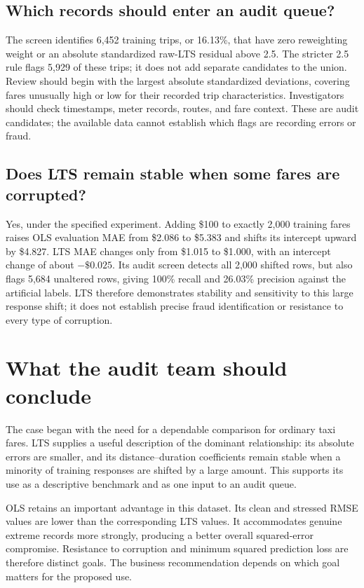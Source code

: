 \documentclass[11pt,letterpaper]{article}
\begin{document}
\subsection{Which records should enter an audit queue?}
The screen identifies 6,452 training trips, or 16.13\%, that have zero reweighting weight or an absolute standardized raw-LTS residual above 2.5. The stricter 2.5 rule flags 5,929 of these trips; it does not add separate candidates to the union. Review should begin with the largest absolute standardized deviations, covering fares unusually high or low for their recorded trip characteristics. Investigators should check timestamps, meter records, routes, and fare context. These are audit candidates; the available data cannot establish which flags are recording errors or fraud.

\subsection{Does LTS remain stable when some fares are corrupted?}
Yes, under the specified experiment. Adding \$100 to exactly 2,000 training fares raises OLS evaluation MAE from \$2.086 to \$5.383 and shifts its intercept upward by \$4.827. LTS MAE changes only from \$1.015 to \$1.000, with an intercept change of about $-\$0.025$. Its audit screen detects all 2,000 shifted rows, but also flags 5,684 unaltered rows, giving 100\% recall and 26.03\% precision against the artificial labels. LTS therefore demonstrates stability and sensitivity to this large response shift; it does not establish precise fraud identification or resistance to every type of corruption.

\clearpage
\section{What the audit team should conclude}
The case began with the need for a dependable comparison for ordinary taxi fares. LTS supplies a useful description of the dominant relationship: its absolute errors are smaller, and its distance--duration coefficients remain stable when a minority of training responses are shifted by a large amount. This supports its use as a descriptive benchmark and as one input to an audit queue.

OLS retains an important advantage in this dataset. Its clean and stressed RMSE values are lower than the corresponding LTS values. It accommodates genuine extreme records more strongly, producing a better overall squared-error compromise. Resistance to corruption and minimum squared prediction loss are therefore distinct goals. The business recommendation depends on which goal matters for the proposed use.
\end{document}
